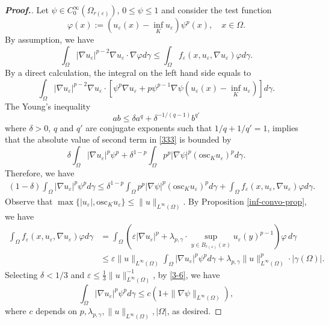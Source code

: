 \documentclass[10pt,a4paper]{amsart}
\begin{document}
\begin{proof}[\bf Proof.]
Let $\psi \in C^{\infty}_0(\Omega_{r(\varepsilon)})$, $0\leq\psi\leq1$ and consider the test function
\[
\varphi(x):=(u_\varepsilon(x)-{\inf}_{K} u_\varepsilon  )\psi^p(x),\quad x\in \Omega.
\]
By assumption, we have
\[
\int_{\Omega}|\nabla u_\varepsilon|^{p-2}\nabla u_\varepsilon\cdot \nabla \varphi d\gamma \leq \int_\Omega  f_\varepsilon(x,u_\varepsilon,\nabla u_\varepsilon)\varphi d\gamma .
\]
By a direct calculation, the integral on the left hand side equals to
\begin{equation}\label{333}
\int_{\Omega} |\nabla u_\varepsilon|^{p-2}\nabla u_\varepsilon \cdot[ \psi^p \nabla u_\varepsilon+p\psi^{p-1}\nabla \psi ( u_\varepsilon(x)-{\inf}_{K} u_\varepsilon)]d\gamma.
\end{equation}
The Young's inequality
\[
ab \leq \delta a^q+\delta^{-1/(q-1)} b^{q'}
\]
where $\delta>0$, $q$ and $q'$ are conjugate exponents such that $1/q+1/q'=1$, implies that the absolute value of second term in \eqref{333} is bounded by
\[
\delta \int_\Omega |\nabla u_\varepsilon|^p \psi^p +\delta^{1-p} \int_\Omega p^p |\nabla \psi|^p (\mathrm{osc}_K u_\varepsilon)^pd\gamma.
\]
Therefore, we have
\begin{align}\label{3-6}
(1-\delta)\int_\Omega |\nabla u_\varepsilon|^p \psi^pd\gamma  \leq  \delta^{1-p}\int_\Omega p^p |\nabla \psi|^p (\mathrm{osc}_K u_\varepsilon)^pd\gamma+\int_\Omega  f_\varepsilon(x,u_\varepsilon,\nabla u_\varepsilon)\varphi d\gamma.
\end{align}
Observe that $\max\{|u_\varepsilon|, \mathrm{osc}_K u_\varepsilon\}\leq \|u\|_{L^{\infty}(\Omega)}$. By Proposition \ref{inf-convo-prop}, we have
\begin{align*}
\int_\Omega  f_\varepsilon(x,u_\varepsilon,\nabla u_\varepsilon)\varphi d\gamma&=\int_\Omega  (\varepsilon |\nabla u_\varepsilon|^p+\lambda_{p,\gamma}\cdot{\sup}_{y\in B_{r(\varepsilon)}(x)} u_\varepsilon(y)^{p-1} )\varphi\,d\gamma\\
& \leq \varepsilon\|u\|_{L^{\infty}(\Omega)}\int_\Omega |\nabla u_\varepsilon|^p  \psi^p  d\gamma+\lambda_{p,\gamma}\|u\|^p_{L^{\infty}(\Omega)}\cdot |\gamma(\Omega)|.
\end{align*}
Selecting $\delta <1/3$ and $\varepsilon\leq \frac{1}{3}\|u\|^{-1}_{L^{\infty}(\Omega)}$, by \eqref{3-6}, we have
\[
\int_\Omega |\nabla u_\varepsilon|^p \psi^pd\gamma  \leq c(1+\|\nabla \psi\|_{L^{\infty}(\Omega)}),
\]
where $c$ depends on $p,\lambda_{p,\gamma},\|u\|_{L^{\infty}(\Omega)},|\Omega|$, as desired.
\end{proof}
\end{document}
